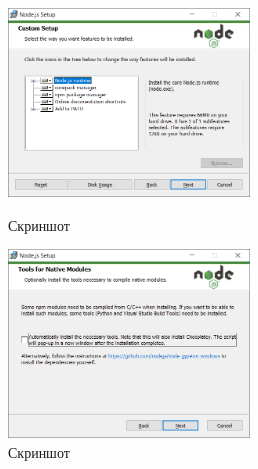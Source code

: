 \begin{figure}[!phtb]
    \centering

    \begin{minipage}{0.49\textwidth}
        \centering

        \includegraphics[height=5cm]
        {images/install/node-js/5.png}

        \caption{Скриншот}

        \label{fig:nodejs_5}
    \end{minipage}
    \begin{minipage}{0.49\textwidth}
        \centering

        \includegraphics[height=5cm]
        {images/install/node-js/6.png}

        \caption{Скриншот}

        \label{fig:nodejs_6}
    \end{minipage}
\end{figure}

